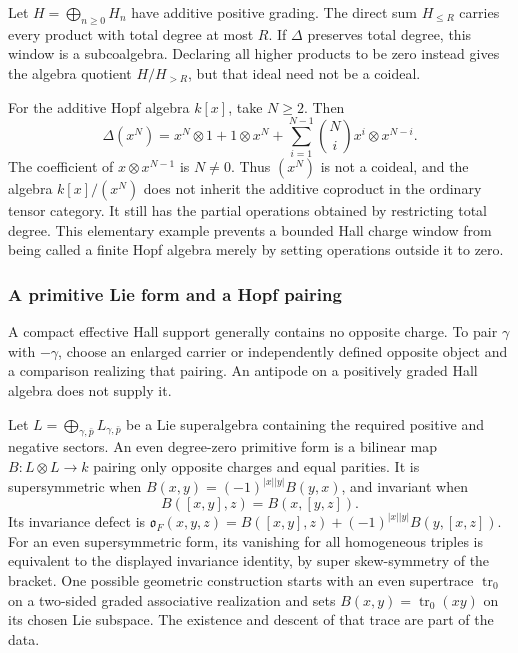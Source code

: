 Let $H=\bigoplus_{n\geq0}H_n$ have additive positive grading.
The direct sum $H_{\leq R}$ carries every product with total
degree at most $R$. If $\Delta$ preserves total degree, this
window is a subcoalgebra. Declaring all higher products to be
zero instead gives the algebra quotient
$H/H_{>R}$, but that ideal need not be a coideal.

For the additive Hopf algebra $k[x]$, take $N\geq2$. Then
\[
 \Delta(x^N)=x^N\otimes1+1\otimes x^N
       +\sum_{i=1}^{N-1}\binom Ni x^i\otimes x^{N-i}.
\]
The coefficient of $x\otimes x^{N-1}$ is $N\ne0$.
Thus $(x^N)$ is not a coideal, and the algebra
$k[x]/(x^N)$ does not inherit the additive coproduct in the
ordinary tensor category. It still has the partial operations
obtained by restricting total degree. This elementary example
prevents a bounded Hall charge window from being called a finite
Hopf algebra merely by setting operations outside it to zero.

\subsubsection*{A primitive Lie form and a Hopf pairing}

A compact effective Hall support generally contains no opposite
charge. To pair $\gamma$ with $-\gamma$, choose an enlarged
carrier or independently defined opposite object and a
comparison realizing that pairing. An antipode on a positively
graded Hall algebra does not supply it.

\begin{definition}
\label{def:finite-hall-positive-negative-pairing}
Let $L=\bigoplus_{\gamma,\bar p}L_{\gamma,\bar p}$ be a Lie
superalgebra containing the required positive and negative
sectors. An even degree-zero primitive form is a bilinear map
$B:L\otimes L\to k$ pairing only opposite charges and equal
parities. It is supersymmetric when
$B(x,y)=(-1)^{|x||y|}B(y,x)$, and invariant when
\[
 B([x,y],z)=B(x,[y,z]).
\]
Its invariance defect is
$\mathfrak o_F(x,y,z)=B([x,y],z)+(-1)^{|x||y|}B(y,[x,z])$.
For an even supersymmetric form, its vanishing for all
homogeneous triples is equivalent to the displayed invariance
identity, by super skew-symmetry of the bracket.
One possible geometric construction starts with an even
supertrace $\operatorname{tr}_0$ on a two-sided graded
associative realization and sets
$B(x,y)=\operatorname{tr}_0(xy)$ on its chosen Lie subspace.
The existence and descent of that trace are part of the data.
\end{definition}

